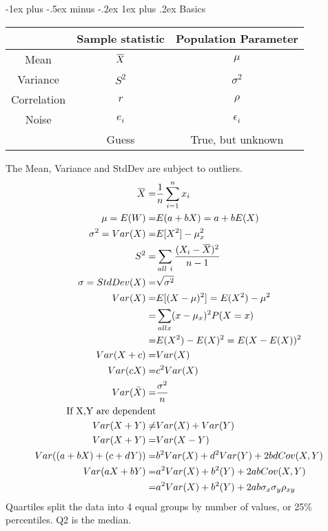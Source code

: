 \documentclass[10pt,landscape]{article}
\makeatletter
\renewcommand{\subsubsection}{\@startsection{subsubsection}{3}{0mm}%
                                {-1ex plus -.5ex minus -.2ex}%
                                {1ex plus .2ex}%
                                {\normalfont\small\bfseries}}
\newcommand{\overbar}[1]{\mkern 1.5mu\overline{\mkern-1.5mu#1\mkern-1.5mu}\mkern 1.5mu}
\makeatother
\begin{document}
\raggedright
\footnotesize
\begin{multicols*}{3}


\setlength{\premulticols}{1pt}
\setlength{\postmulticols}{1pt}
\setlength{\multicolsep}{1pt}
\setlength{\columnsep}{2pt}
\setlength{\columnseprule}{1pt}


\subsubsection{Basics}

\begin{tabular}{| c | c | c| }
\hline
 & Sample statistic &  Population Parameter \\
 \hline
 Mean & $\overbar{X}$ & $\mu$ \\
 Variance & $S^2$ & $\sigma^2$ \\
 Correlation & $r$ & $\rho$ \\
  Noise & $e_i$ & $\epsilon_i$ \\
\hline
& Guess & True, but unknown \\
\hline
\end{tabular}

The Mean, Variance and StdDev are subject to outliers.
\begin{align*}
\overbar{X} =& \frac{1}{n} \sum\limits_{i=1}^n x_i \\
\mu = E(W) =& E(a + bX) = a + bE(X)\\
\sigma^2 = Var(X) =& E[X^2] - \mu_x^2\\
S^2 =& \sum\limits_{all\ i} \frac{(X_i - \overbar{X})^2}{n-1}\\
\sigma = StdDev(X) =& \sqrt{\sigma^2}\\
Var(X) =& E[(X - \mu)^2]  = E(X^2) - \mu^2\\
	=& \sum_{all x} (x - \mu_x)^2 P(X = x)\\
	=& E(X^2) - E(X)^2 = E(X - E(X))^2\\
Var(X + c) =& Var(X)\\
Var(cX) =& c^2Var(X)\\
Var(\bar{X}) =& \frac{\sigma^2}{n} \\
 \text{If X,Y are dependent}\\
Var(X+Y) \ne& Var(X) + Var(Y)\\
Var(X + Y) =& Var(X - Y)\\
Var((a + bX) + (c + dY)) =& b^2Var(X) + d^2Var(Y) + 2bdCov(X,Y)\\
Var(aX + bY) =& a^2 Var(X) + b^2(Y) + 2abCov(X,Y) \\
	=& a^2 Var(X) + b^2(Y) + 2ab\sigma_x \sigma_y \rho_{xy}\\
\end{align*}
Quartiles split the data into 4 equal groups by number of values, or 25\% percentiles.
Q2 is the median.


\end{multicols*}
\end{document}
